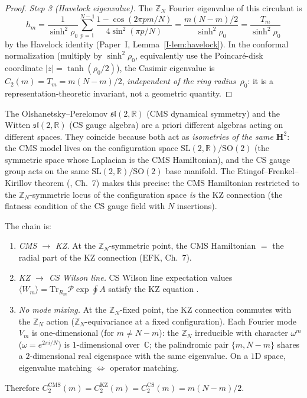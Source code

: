 \begin{proof}
\emph{Step 3 (Havelock eigenvalue).}
The $\mathbb{Z}_N$ Fourier eigenvalue of this circulant is
\[
  h_m = \frac{1}{\sinh^2\!\rho_0}
  \sum_{p=1}^{N-1}\frac{1 - \cos(2\pi pm/N)}{4\sin^2(\pi p/N)}
  = \frac{m(N{-}m)/2}{\sinh^2\!\rho_0} = \frac{T_m}{\sinh^2\!\rho_0}
\]
by the Havelock identity (Paper~I, Lemma~\ref*{I-lem:havelock}).
In the conformal normalization
(multiply by $\sinh^2\!\rho_0$, equivalently
use the Poincar\'e-disk coordinate $|z| = \tanh(\rho_0/2)$),
the Casimir eigenvalue is
$C_2(m) = T_m = m(N{-}m)/2$,
\emph{independent of the ring radius~$\rho_0$}:
it is a representation-theoretic invariant, not a geometric
quantity.
\end{proof}

\begin{remark}
\label{rmk:same-sl2}
The Olshanetsky--Perelomov $\mathfrak{sl}(2,\mathbb{R})$ (CMS
dynamical symmetry) and the Witten $\mathfrak{sl}(2,\mathbb{R})$
(CS gauge algebra) are a priori different algebras acting on
different spaces.
They coincide because both act as \emph{isometries of
the same $\mathbf{H}^2$}: the CMS model lives on the
configuration space
$\mathrm{SL}(2,\mathbb{R})/\mathrm{SO}(2)$
(the symmetric space whose Laplacian is the CMS Hamiltonian),
and the CS gauge group acts on the same
$\mathrm{SL}(2,\mathbb{R})/\mathrm{SO}(2)$ base manifold.
The Etingof--Frenkel--Kirillov theorem
(\citeyear{EtingofFrenkelKirillov1998}, Ch.~7)
makes this precise: the CMS Hamiltonian restricted to the
$\mathbb{Z}_N$-symmetric locus of the configuration space
\emph{is} the KZ connection (the flatness condition of
the CS gauge field with $N$ insertions).

The chain is:
\begin{enumerate}
\item \emph{CMS $\to$ KZ.}
  At the $\mathbb{Z}_N$-symmetric point, the CMS Hamiltonian
  $=$ the radial part of the KZ connection (EFK, Ch.~7).
\item \emph{KZ $\to$ CS Wilson line.}
  CS Wilson line expectation values
  $\langle W_m\rangle = \mathrm{Tr}_{R_m}
  \mathcal{P}\exp\!\oint\! A$
  satisfy the KZ equation \citep{Witten1989Jones}.
\item \emph{No mode mixing.}
  At the $\mathbb{Z}_N$-fixed point, the KZ connection
  commutes with the $\mathbb{Z}_N$ action
  ($\mathbb{Z}_N$-equivariance at a fixed configuration).
  Each Fourier mode~$V_m$ is one-dimensional
  (for $m \ne N{-}m$): the $\mathbb{Z}_N$ irreducible
  with character $\omega^m$ ($\omega = e^{2\pi i/N}$)
  is $1$-dimensional over~$\mathbb{C}$; the palindromic
  pair $\{m, N{-}m\}$ shares a $2$-dimensional real
  eigenspace with the same eigenvalue.
  On a $1$D space, eigenvalue matching $\Leftrightarrow$
  operator matching.
\end{enumerate}
Therefore $C_2^{\mathrm{CMS}}(m)
= C_2^{\mathrm{KZ}}(m)
= C_2^{\mathrm{CS}}(m) = m(N{-}m)/2$.
\end{remark}

